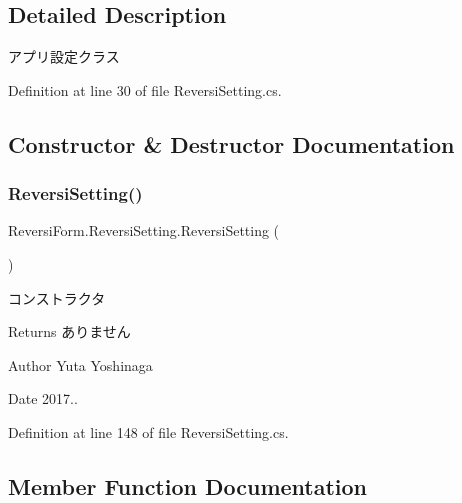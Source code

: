 \subsection{Detailed Description}
アプリ設定クラス 

Definition at line 30 of file Reversi\+Setting.\+cs.



\subsection{Constructor \& Destructor Documentation}
\mbox{\label{class_reversi_form_1_1_reversi_setting_a985e02a2cbf355f46474efc51a5b3728}} 
\subsubsection{\texorpdfstring{Reversi\+Setting()}{ReversiSetting()}}
{\footnotesize\ttfamily Reversi\+Form.\+Reversi\+Setting.\+Reversi\+Setting (\begin{DoxyParamCaption}{ }\end{DoxyParamCaption})}



コンストラクタ 

\begin{DoxyReturn}{Returns}
ありません 
\end{DoxyReturn}
\begin{DoxyAuthor}{Author}
Yuta Yoshinaga 
\end{DoxyAuthor}
\begin{DoxyDate}{Date}
2017.. 
\end{DoxyDate}


Definition at line 148 of file Reversi\+Setting.\+cs.



\subsection{Member Function Documentation}
\mbox{\label{class_reversi_form_1_1_reversi_setting_a5ba1f3b862a9938fb89045c3b22dec51}} 
